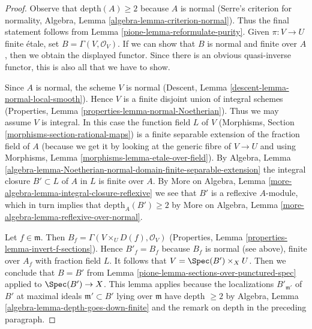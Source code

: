 \begin{proof}

Observe that $\text{depth}(A) \geq 2$ because $A$ is normal
(Serre's criterion for normality, Algebra, Lemma
\ref{algebra-lemma-criterion-normal}).
Thus the final statement follows from Lemma \ref{pione-lemma-reformulate-purity}.
Given $\pi : V \to U$ finite \'etale, set $B = \Gamma(V, \mathcal{O}_V)$.
If we can show that $B$ is normal and finite over $A$, then
we obtain the displayed functor. Since there is an obvious
quasi-inverse functor, this is also all that we have to show.

\medskip\noindent
Since $A$ is normal, the scheme $V$ is normal
(Descent, Lemma \ref{descent-lemma-normal-local-smooth}).
Hence $V$ is a finite disjoint union of integral schemes
(Properties, Lemma \ref{properties-lemma-normal-Noetherian}).
Thus we may assume $V$ is integral.
In this case the function field $L$ of $V$
(Morphisms, Section \ref{morphisms-section-rational-maps})
is a finite separable extension of the fraction field of $A$
(because we get it by looking at the generic fibre
of $V \to U$ and using Morphisms, Lemma
\ref{morphisms-lemma-etale-over-field}).
By Algebra, Lemma
\ref{algebra-lemma-Noetherian-normal-domain-finite-separable-extension}
the integral closure $B' \subset L$ of $A$ in $L$ is finite over $A$.
By More on Algebra, Lemma \ref{more-algebra-lemma-integral-closure-reflexive}
we see that $B'$ is a reflexive $A$-module, which in turn implies
that $\text{depth}_A(B') \geq 2$ by
More on Algebra, Lemma \ref{more-algebra-lemma-reflexive-over-normal}.

\medskip\noindent
Let $f \in \mathfrak m$. Then $B_f = \Gamma(V \times_U D(f), \mathcal{O}_V)$
(Properties, Lemma \ref{properties-lemma-invert-f-sections}).
Hence $B'_f = B_f$ because $B_f$ is normal (see above),
finite over $A_f$ with fraction field $L$.
It follows that $V = \Spec(B') \times_X U$.
Then we conclude that $B = B'$ from
Lemma \ref{pione-lemma-sections-over-punctured-spec}
applied to $\Spec(B') \to X$.
This lemma applies because the localizations $B'_{\mathfrak m'}$
of $B'$ at maximal ideals $\mathfrak m' \subset B'$ lying over
$\mathfrak m$ have depth $\geq 2$ by
Algebra, Lemma \ref{algebra-lemma-depth-goes-down-finite}
and the remark on depth in the preceding paragraph.
\end{proof}


